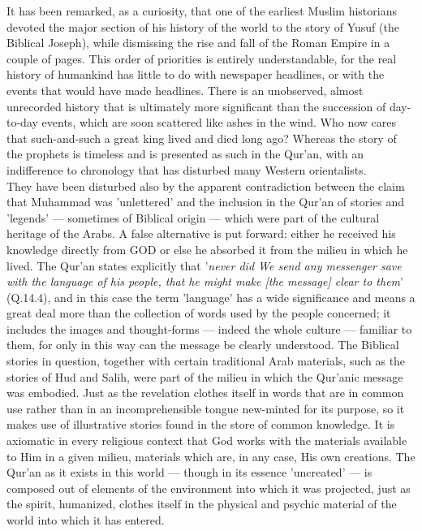 \documentclass[10pt, twoside]{book}
\begin{document}
It has been remarked, as a curiosity, that one of the earliest Muslim historians devoted the major 
section of his history of the world to the story of Yusuf (the Biblical Joseph), while dismissing the 
rise and fall of the Roman Empire in a couple of pages. This order of priorities is entirely 
understandable, for the real history of humankind has little to do with newspaper headlines, or with 
the events that would have made headlines. There is an unobserved, almost unrecorded history that is 
ultimately more significant than the succession of day\hyp{}to\hyp{}day events, which are soon scattered like 
ashes in the wind. Who now cares that such\hyp{}and\hyp{}such a great king lived and died long ago? Whereas the 
story of the prophets is timeless and is presented as such in the Qur'an, with an indifference to 
chronology that has disturbed many Western orientalists. \\

They have been disturbed also by the apparent contradiction between the claim that Muhammad was 
'unlettered' and the inclusion in the Qur'an of stories and 'legends' --- sometimes of Biblical origin 
--- which were part of the cultural heritage of the Arabs. A false alternative is put forward: either 
he received his knowledge directly from GOD or else he absorbed it from the milieu in which he lived. 
The Qur'an states explicitly that '\emph{never did We send any messenger save with the language of his 
people, that he might make [the message] clear to them}' (Q.14.4), and in this case the term 'language' 
has a wide significance and means a great deal more than the collection of words used by the people 
concerned; it includes the images and thought-forms --- indeed the whole culture --- familiar to them, 
for only in this way can the message be clearly understood. The Biblical stories in question, 
together with certain traditional Arab materials, such as the stories of Hud and Salih, were part of 
the milieu in which the Qur'anic message was embodied. Just as the revelation clothes itself in words 
that are in common use rather than in an incomprehensible tongue new\hyp{}minted for its purpose, so it 
makes use of illustrative stories found in the store of common knowledge. It is axiomatic in every 
religious context that God works with the materials available to Him in a given milieu, materials 
which are, in any case, His own creations. The Qur'an as it exists in this world --- though in its 
essence 'uncreated' --- is composed out of elements of the environment into which it was projected, 
just as the spirit, humanized, clothes itself in the physical and psychic material of the world into 
which it has entered. \\
\end{document}
